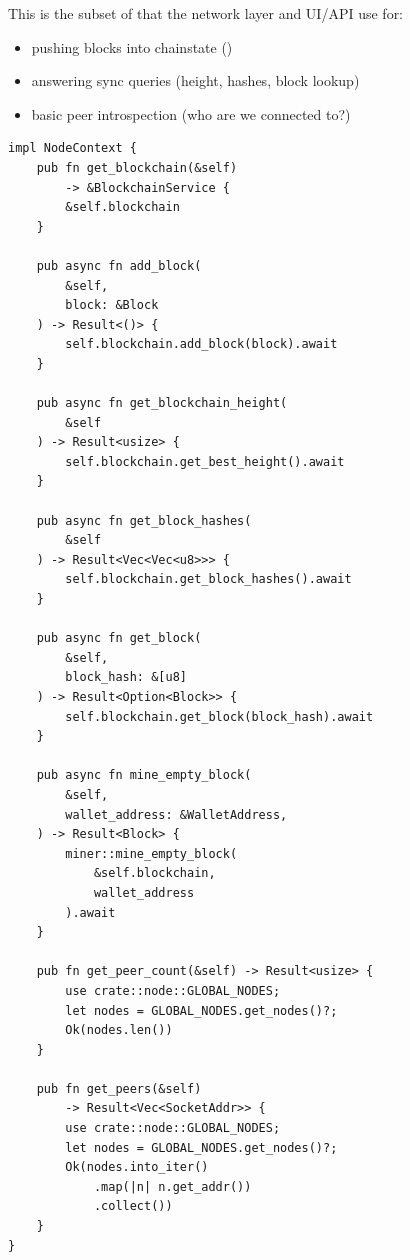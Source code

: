 This is the subset of  that the network layer and UI/API use for:

\begin{itemize}
  \item pushing blocks into chainstate ()
  \item answering sync queries (height, hashes, block lookup)
  \item basic peer introspection (who are we connected to?)
\end{itemize}

\begin{listing}[htbp]
\caption{NodeContext block and chain queries}
\label{lst:ch13-block-queries}
\begin{verbatim}
impl NodeContext {
    pub fn get_blockchain(&self)
        -> &BlockchainService {
        &self.blockchain
    }

    pub async fn add_block(
        &self,
        block: &Block
    ) -> Result<()> {
        self.blockchain.add_block(block).await
    }

    pub async fn get_blockchain_height(
        &self
    ) -> Result<usize> {
        self.blockchain.get_best_height().await
    }

    pub async fn get_block_hashes(
        &self
    ) -> Result<Vec<Vec<u8>>> {
        self.blockchain.get_block_hashes().await
    }

    pub async fn get_block(
        &self,
        block_hash: &[u8]
    ) -> Result<Option<Block>> {
        self.blockchain.get_block(block_hash).await
    }

    pub async fn mine_empty_block(
        &self,
        wallet_address: &WalletAddress,
    ) -> Result<Block> {
        miner::mine_empty_block(
            &self.blockchain,
            wallet_address
        ).await
    }

    pub fn get_peer_count(&self) -> Result<usize> {
        use crate::node::GLOBAL_NODES;
        let nodes = GLOBAL_NODES.get_nodes()?;
        Ok(nodes.len())
    }

    pub fn get_peers(&self)
        -> Result<Vec<SocketAddr>> {
        use crate::node::GLOBAL_NODES;
        let nodes = GLOBAL_NODES.get_nodes()?;
        Ok(nodes.into_iter()
            .map(|n| n.get_addr())
            .collect())
    }
}
\end{verbatim}
\end{listing}

